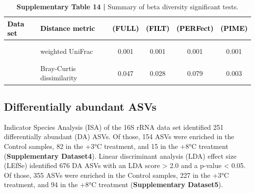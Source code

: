 \documentclass[
  10pt,
  letterpaper,
  DIV=11,
  numbers=noendperiod]{scrartcl}
\begin{document}
\begin{table}[H]

\caption{\textbf{Supplementary Table 14 |} Summary of beta diversity significant tests.}
\centering
\fontsize{9}{11}\selectfont
\begin{tabular}[t]{llcccc}
\toprule
\textcolor{black}{\textbf{Data set}} & \textcolor{black}{\textbf{Distance metric}} & \textcolor{black}{\textbf{(FULL)}} & \textcolor{black}{\textbf{(FILT)}} & \textcolor{black}{\textbf{(PERFect)}} & \textcolor{black}{\textbf{(PIME)}}\\
\midrule
\addlinespace[1em]
\multicolumn{6}{l}{\textbf{16S rRNA}}\\
\hspace{1em}\cellcolor{gray!6}{} & \cellcolor{gray!6}{unweighted UniFrac} & \cellcolor{gray!6}{0.003} & \cellcolor{gray!6}{0.003} & \cellcolor{gray!6}{0.003} & \cellcolor{gray!6}{0.001}\\
\hspace{1em} & weighted UniFrac & 0.001 & 0.001 & 0.001 & 0.001\\
\addlinespace[0.3em]
\multicolumn{6}{l}{\textbf{ITS}}\\
\hspace{1em}\cellcolor{gray!6}{} & \cellcolor{gray!6}{Jensen-Shannon divergence} & \cellcolor{gray!6}{0.036} & \cellcolor{gray!6}{0.030} & \cellcolor{gray!6}{0.063} & \cellcolor{gray!6}{0.002}\\
\hspace{1em} & Bray-Curtis dissimilarity & 0.047 & 0.028 & 0.079 & 0.003\\
\bottomrule
\end{tabular}
\end{table}

\hypertarget{differentially-abundant-asvs}{%
\subsection{Differentially abundant
ASVs}\label{differentially-abundant-asvs}}

Indicator Species Analysis (ISA) of the 16S rRNA data set identified 251
differentially abundant (DA) ASVs. Of those, 154 ASVs were enriched in
the Control samples, 82 in the +3°C treatment, and 15 in the +8°C
treatment (\textbf{Supplementary Dataset4}). Linear discriminant
analysis (LDA) effect size (LEfSe) identified 676 DA ASVs with an LDA
score \textgreater{} 2.0 and a p-value \textless{} 0.05. Of those, 355
ASVs were enriched in the Control samples, 227 in the +3°C treatment,
and 94 in the +8°C treatment (\textbf{Supplementary Dataset5}).
\end{document}
